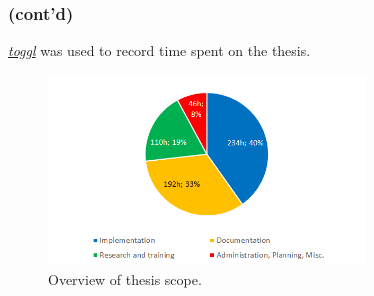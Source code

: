 \documentclass{beamer}
\newcommand{\recallframetitle}{}
\newcommand{\frametitlecont}{%
    \frametitle{\recallframetitle{} (cont'd)}%
}
\begin{document}
    \begin{frame}
        \frametitlecont{}
        \par \href{https://toggl.com/app/bookmark/03a8815eedda53a54dcc49829427f8dc}{\textit{toggl}} was used to record time spent on the thesis.
        \begin{figure}
            \includegraphics[width=0.75\textwidth]{images/presentation/TimeSplit.png}
            \caption{Overview of thesis scope.}
            \label{fig:time_split}
        \end{figure}
    \end{frame}

    \begingroup
        \begin{frame}{}
        \end{frame}
    \endgroup
\end{document}
